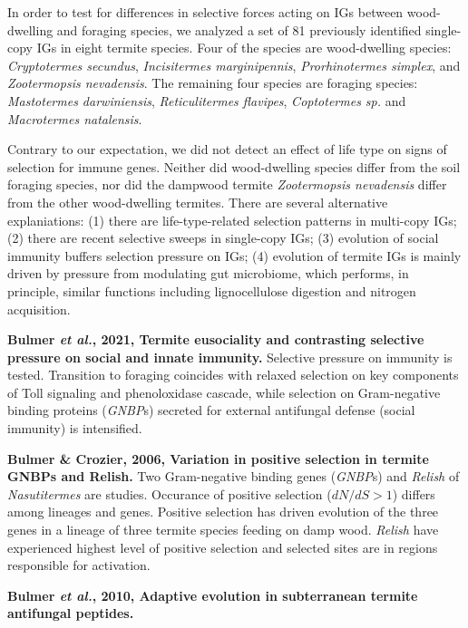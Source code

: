 \documentclass[11pt]{article}
\begin{document}
\begin{sloppypar}
\par
In order to test for differences in selective forces acting on IGs between wood-dwelling and foraging species, we analyzed a set of 81 previously identified single-copy IGs in eight termite species. 
Four of the species are wood-dwelling species: \textit{Cryptotermes secundus}, \textit{Incisitermes marginipennis}, \textit{Prorhinotermes simplex}, and \textit{Zootermopsis nevadensis}. 
The remaining four species are foraging species: \textit{Mastotermes darwiniensis}, \textit{Reticulitermes flavipes}, \textit{Coptotermes sp.} and \textit{Macrotermes natalensis}. 
\par
Contrary to our expectation, we did not detect an effect of life type on signs of selection for immune genes. 
Neither did wood-dwelling species differ from the soil foraging species, nor did the dampwood termite \textit{Zootermopsis nevadensis} differ from the other wood-dwelling termites. 
There are several alternative explaniations: 
(1) there are life-type-related selection patterns in multi-copy IGs; 
(2) there are recent selective sweeps in single-copy IGs; 
(3) evolution of social immunity buffers selection pressure on IGs; 
(4) evolution of termite IGs is mainly driven by pressure from modulating gut microbiome, which performs, in principle, similar functions including lignocellulose digestion and nitrogen acquisition. 
\par
\textbf{Bulmer \textit{et al.}, 2021, Termite eusociality and contrasting selective pressure on social and innate immunity.} \newline
Selective pressure on immunity is tested. 
Transition to foraging coincides with relaxed selection on key components of Toll signaling and phenoloxidase cascade, while selection on Gram-negative binding proteins (\textit{GNBP}s) secreted for external antifungal defense (social immunity) is intensified. 
\par
\textbf{Bulmer & Crozier, 2006, Variation in positive selection in termite GNBPs and Relish.} \newline
Two Gram-negative binding genes (\textit{GNBP}s) and \textit{Relish} of \textit{Nasutitermes} are studies. 
Occurance of positive selection ($dN/dS>1$) differs among lineages and genes. 
Positive selection has driven evolution of the three genes in a lineage of three termite species feeding on damp wood. 
\textit{Relish} have experienced highest level of positive selection and selected sites are in regions responsible for activation.
\par
\textbf{Bulmer \textit{et al.}, 2010, Adaptive evolution in subterranean termite antifungal peptides.} \newline

\end{sloppypar}
\end{document}

